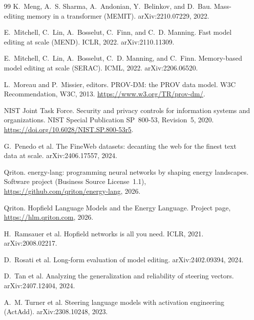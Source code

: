 \documentclass[10pt,twocolumn]{article}
\theoremstyle{remark}
\begin{document}
\begin{thebibliography}{99}
K.~Meng, A.~S. Sharma, A.~Andonian, Y.~Belinkov, and D.~Bau.
\newblock Mass-editing memory in a transformer (MEMIT).
\newblock arXiv:2210.07229, 2022.

E.~Mitchell, C.~Lin, A.~Bosselut, C.~Finn, and C.~D. Manning.
\newblock Fast model editing at scale (MEND).
\newblock ICLR, 2022. arXiv:2110.11309.

E.~Mitchell, C.~Lin, A.~Bosselut, C.~D. Manning, and C.~Finn.
\newblock Memory-based model editing at scale (SERAC).
\newblock ICML, 2022. arXiv:2206.06520.

L.~Moreau and P.~Missier, editors.
\newblock PROV-DM: the PROV data model.
\newblock W3C Recommendation, W3C, 2013. \url{https://www.w3.org/TR/prov-dm/}.

NIST Joint Task Force.
\newblock Security and privacy controls for information systems and organizations.
\newblock NIST Special Publication SP~800-53, Revision~5, 2020.
\url{https://doi.org/10.6028/NIST.SP.800-53r5}.

G.~Penedo et al.
\newblock The FineWeb datasets: decanting the web for the finest text data at scale.
\newblock arXiv:2406.17557, 2024.

Qriton.
\newblock energy-lang: programming neural networks by shaping energy landscapes.
\newblock Software project (Business Source License~1.1), \url{https://github.com/qriton/energy-lang}, 2026.

Qriton.
\newblock Hopfield Language Models and the Energy Language.
\newblock Project page, \url{https://hlm.qriton.com}, 2026.

H.~Ramsauer et al.
\newblock Hopfield networks is all you need.
\newblock ICLR, 2021. arXiv:2008.02217.

D.~Rosati et al.
\newblock Long-form evaluation of model editing.
\newblock arXiv:2402.09394, 2024.

D.~Tan et al.
\newblock Analyzing the generalization and reliability of steering vectors.
\newblock arXiv:2407.12404, 2024.

A.~M. Turner et al.
\newblock Steering language models with activation engineering (ActAdd).
\newblock arXiv:2308.10248, 2023.


\end{thebibliography}
\end{document}
